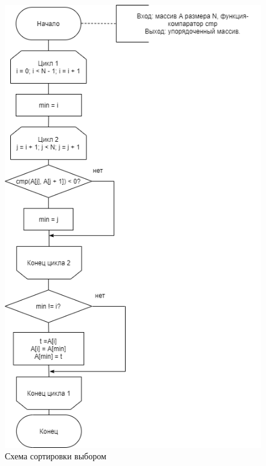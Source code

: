 \documentclass[12pt]{report}
\begin{document}
\begin{figure}[h!p]
	\raggedleft
	\includegraphics[width=0.75\linewidth]{ssort.png}
	\caption{Схема сортировки выбором}
	\label{sels}
\end{figure}
\end{document}
